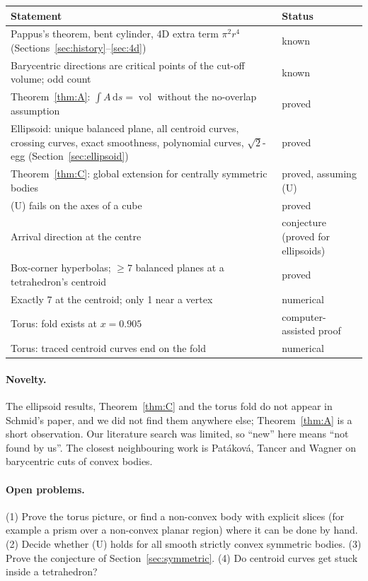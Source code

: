 \documentclass[11pt]{article}
\theoremstyle{plain}
\theoremstyle{definition}
\theoremstyle{remark}
\newcommand{\vol}{\operatorname{vol}}
\newcommand{\dd}{\,\mathrm{d}}
\begin{document}
\begin{center}
\small
\begin{tabularx}{\linewidth}{>{\raggedright\arraybackslash}X l}
\toprule
\textbf{Statement} & \textbf{Status}\\
\midrule
Pappus's theorem, bent cylinder, 4D extra term $\pi^2r^4$ (Sections~\ref{sec:history}--\ref{sec:4d}) & known\\
Barycentric directions are critical points of the cut-off volume; odd count & known\\
Theorem~\ref{thm:A}: $\int A\dd s=\vol$ without the no-overlap assumption & proved\\
Ellipsoid: unique balanced plane, all centroid curves, crossing curves, exact smoothness, polynomial curves, $\sqrt2$-egg (Section~\ref{sec:ellipsoid}) & proved\\
Theorem~\ref{thm:C}: global extension for centrally symmetric bodies & proved, assuming (U)\\
(U) fails on the axes of a cube & proved\\
Arrival direction at the centre & conjecture (proved for ellipsoids)\\
Box-corner hyperbolas; $\ge7$ balanced planes at a tetrahedron's centroid & proved\\
Exactly 7 at the centroid; only 1 near a vertex & numerical\\
Torus: fold exists at $x=0.905$ & computer-assisted proof\\
Torus: traced centroid curves end on the fold & numerical\\
\bottomrule
\end{tabularx}
\end{center}

\paragraph{Novelty.} The ellipsoid results, Theorem~\ref{thm:C} and the torus fold do not appear in Schmid's paper, and we did not find them anywhere else; Theorem~\ref{thm:A} is a short observation. Our literature search was limited, so ``new'' here means ``not found by us''. The closest neighbouring work is Patáková, Tancer and Wagner \cite{ptw} on barycentric cuts of convex bodies.

\paragraph{Open problems.} (1) Prove the torus picture, or find a non-convex body with explicit slices (for example a prism over a non-convex planar region) where it can be done by hand. (2) Decide whether (U) holds for all smooth strictly convex symmetric bodies. (3) Prove the conjecture of Section~\ref{sec:symmetric}. (4) Do centroid curves get stuck inside a tetrahedron?
\end{document}
